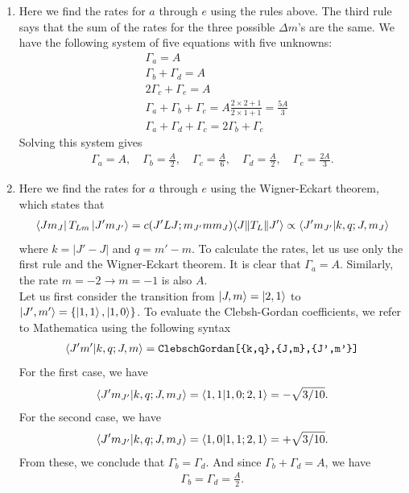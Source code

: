 \documentclass{article}
\theoremstyle{definition}
\newcommand{\f}[2]{\frac{#1}{#2}}
\begin{document}
\begin{enumerate}[label=(\alph*)]
	\item Here we find the rates for $a$ through $e$ using the rules above. The third rule says that the sum of the rates for the three possible $\Delta m$'s are the same. We have the following system of five equations with five unknowns:
	\begin{align*}
	&\Gamma_a = A \\
	&\Gamma_b+ \Gamma_d = A \\
	& 2\Gamma_c + \Gamma_e = A\\
	&\Gamma_a + \Gamma_b + \Gamma_c = A \f{2\times 2+1}{2\times 1 + 1} = \f{5A}{3}\\
	& \Gamma_a + \Gamma_d + \Gamma_c = 2\Gamma_b + \Gamma_e
	\end{align*} 
	Solving this system gives
	\begin{align*}
	\Gamma_a = A, \quad \Gamma_b = \f{A}{2}, \quad \Gamma_c = \f{A}{6}, \quad \Gamma_d = \f{A}{2}, \quad \Gamma_e = \f{2A}{3}.
	\end{align*}
	
	
		
	\item Here we find the rates for $a$ through $e$ using the Wigner-Eckart theorem, which states that
	\begin{align*}
	\bra{J m_J} T_{Lm} \ket{J'm_{J'}} = c(J'LJ; m_{J'}mm_J) \langle J \norm{T_L} J'\rangle \propto \bra{J'm_{J'}}\ket{k,q; J,m_J} 
	\end{align*} 
	where $k=|J'-J|$ and $q = m'-m $. To calculate the rates, let us use only the first rule and the Wigner-Eckart theorem. It is clear that $\Gamma_a = A$. Similarly, the  rate $m=-2\to m=-1$ is also $A$.\\
	
	
	Let us first consider the transition from $\ket{J,m} = \ket{2,1}$ to $\ket{J',m'} = \{\ket{1,1},\ket{1,0}\}$. To evaluate the Clebsh-Gordan coefficients, we refer to Mathematica using the following syntax
	\begin{align*}
	\bra{J'm'}\ket{k,q; J,m}  = \texttt{ClebschGordan[\{k,q\},\{J,m\},\{J',m'\}]}
	\end{align*}
	For the first case, we have
	\begin{align*}
	\bra{J'm_{J'}}\ket{k,q; J,m_J} = \bra{1,1}\ket{1,0; 2,1} =  -\sqrt{3/10}.
	\end{align*}
	For the second case, we have
	\begin{align*}
	\bra{J'm_{J'}}\ket{k,q; J,m_J} = \bra{1,0}\ket{1,1; 2,1} =  +\sqrt{3/10}.
	\end{align*}
	From these, we conclude that $\Gamma_b = \Gamma_d$. And since $\Gamma_b + \Gamma_d= A$, we have
	\begin{align*}
	\Gamma_b = \Gamma_d = \f{A}{2}.
	\end{align*}
	

\end{enumerate}
\end{document}
